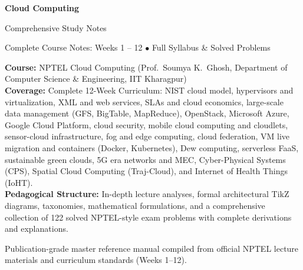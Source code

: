 \documentclass[11pt,a4paper,openany]{report}
\begin{document}
\begin{titlepage}
\thispagestyle{empty}
\vspace*{1.5cm}
\begin{tcolorbox}[colback=navy,colframe=slate,boxrule=3pt,arc=3mm,
  left=10mm,right=10mm,top=14mm,bottom=14mm]
{\color{white}\Huge\bfseries Cloud Computing\par}
\vspace{0.5cm}
{\color{white}\LARGE Comprehensive Study Notes\par}
\vspace{0.5cm}
{\color{white}\large Complete Course Notes: Weeks 1 -- 12 \quad $\bullet$ \quad Full Syllabus \& Solved Problems\par}
\end{tcolorbox}
\vspace{3cm}
\begin{tcolorbox}[colback=paleblue,colframe=navy,arc=2mm]
\textbf{Course:} NPTEL Cloud Computing (Prof.\ Soumya K.\ Ghosh, Department of Computer Science \& Engineering, IIT Kharagpur)\\[2pt]
\textbf{Coverage:} Complete 12-Week Curriculum: NIST cloud model, hypervisors and virtualization, XML and web services, SLAs and cloud economics, large-scale data management (GFS, BigTable, MapReduce), OpenStack, Microsoft Azure, Google Cloud Platform, cloud security, mobile cloud computing and cloudlets, sensor-cloud infrastructure, fog and edge computing, cloud federation, VM live migration and containers (Docker, Kubernetes), Dew computing, serverless FaaS, sustainable green clouds, 5G era networks and MEC, Cyber-Physical Systems (CPS), Spatial Cloud Computing (Traj-Cloud), and Internet of Health Things (IoHT).\\[2pt]
\textbf{Pedagogical Structure:} In-depth lecture analyses, formal architectural TikZ diagrams, taxonomies, mathematical formulations, and a comprehensive collection of 122 solved NPTEL-style exam problems with complete derivations and explanations.
\end{tcolorbox}
\vfill
{\color{slate}\small Publication-grade master reference manual compiled from official NPTEL lecture materials and curriculum standards (Weeks 1--12).}
\end{titlepage}

\pagestyle{fancy}
\tableofcontents
\clearpage

\end{document}
